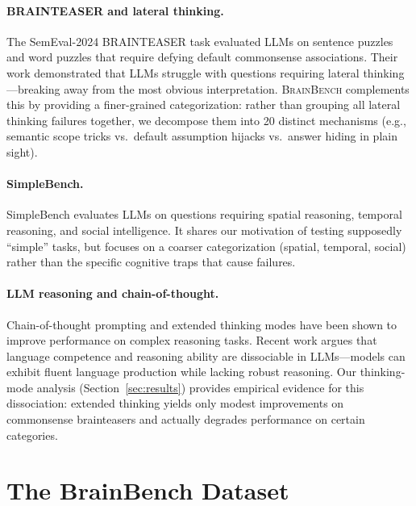 \documentclass[11pt]{article}
\newcommand{\bench}{\textsc{BrainBench}}
\begin{document}
\paragraph{BRAINTEASER and lateral thinking.}
The SemEval-2024 BRAINTEASER task \citep{jiang2024brainteaser} evaluated LLMs on sentence puzzles and word puzzles that require defying default commonsense associations. Their work demonstrated that LLMs struggle with questions requiring lateral thinking---breaking away from the most obvious interpretation. \bench{} complements this by providing a finer-grained categorization: rather than grouping all lateral thinking failures together, we decompose them into 20 distinct mechanisms (e.g., semantic scope tricks vs.\ default assumption hijacks vs.\ answer hiding in plain sight).

\paragraph{SimpleBench.}
SimpleBench \citep{simplebench2024} evaluates LLMs on questions requiring spatial reasoning, temporal reasoning, and social intelligence. It shares our motivation of testing supposedly ``simple'' tasks, but focuses on a coarser categorization (spatial, temporal, social) rather than the specific cognitive traps that cause failures.

\paragraph{LLM reasoning and chain-of-thought.}
Chain-of-thought prompting \citep{wei2022chain} and extended thinking modes have been shown to improve performance on complex reasoning tasks. Recent work \citep{mahowald2024dissociating} argues that language competence and reasoning ability are dissociable in LLMs---models can exhibit fluent language production while lacking robust reasoning. Our thinking-mode analysis (Section~\ref{sec:results}) provides empirical evidence for this dissociation: extended thinking yields only modest improvements on commonsense brainteasers and actually degrades performance on certain categories.

\section{The BrainBench Dataset}
\label{sec:dataset}
\end{document}
